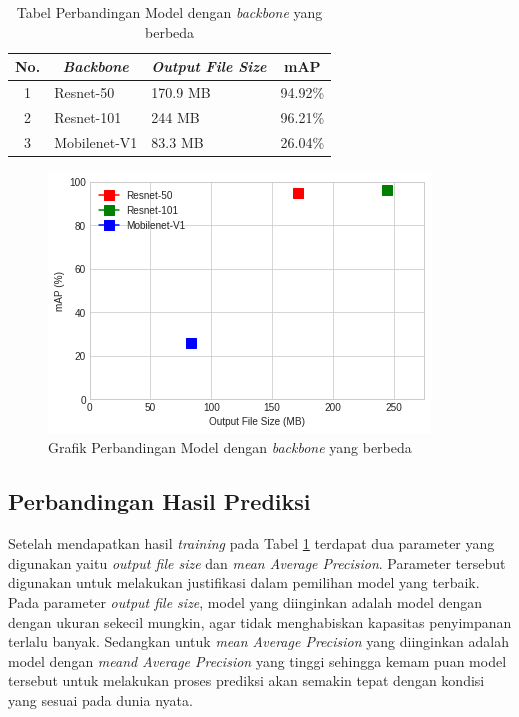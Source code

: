 \begin{table}[h]
	\centering
	\begin{tabular}{|c|l|l|l|}
		\hline
		\textbf{No.} & \multicolumn{1}{c|}{\textit{\textbf{Backbone}}} & \multicolumn{1}{c|}{\textit{\textbf{Output File Size}}} & \multicolumn{1}{c|}{\textbf{mAP}} \\ \hline
		1            & Resnet-50                                       & 170.9 MB                                                & 94.92\%                           \\ \hline
		2            & Resnet-101                                      & 244 MB                                                  & 96.21\%                           \\ \hline
		3            & Mobilenet-V1                                    & 83.3 MB                                                 & 26.04\%                           \\ \hline
	\end{tabular}
	\caption{Tabel Perbandingan Model dengan \textit{backbone} yang berbeda}
	\label{tab:train-recap}
\end{table}

\newpage

\begin{figure}[h]
	\centering
	\includegraphics[scale=0.75]{gambar/graph-recap.png}
	\caption{Grafik Perbandingan Model dengan \textit{backbone} yang berbeda}
	\label{fig:graph-recap}
\end{figure}

\subsection{Perbandingan Hasil Prediksi}
\label{subsec:perbandingan-hasil-prediksi}

Setelah mendapatkan hasil \textit{training} pada Tabel \ref{tab:train-recap} terdapat dua parameter yang digunakan yaitu \textit{output file size} dan \textit{mean Average Precision}. Parameter tersebut digunakan untuk melakukan justifikasi dalam pemilihan model yang terbaik. Pada parameter \textit{output file size}, model yang diinginkan adalah model dengan dengan ukuran sekecil mungkin, agar tidak menghabiskan kapasitas penyimpanan terlalu banyak. Sedangkan untuk \textit{mean Average Precision} yang diinginkan adalah model dengan \textit{meand Average Precision} yang tinggi sehingga kemam puan model tersebut untuk melakukan proses prediksi akan semakin tepat dengan kondisi yang sesuai pada dunia nyata.

